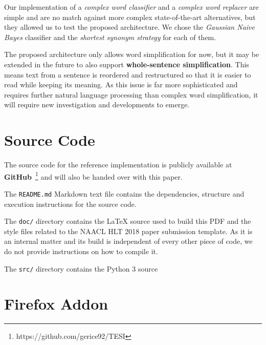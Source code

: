 \documentclass[11pt,a4paper]{article}
\begin{document}
Our implementation of a \emph{complex word classifier} and a \emph{complex word replacer} are simple and are no match against more complex state-of-the-art alternatives, but they allowed us to test the proposed architecture. We chose the \emph{Gaussian Naive Bayes} classifier and the \emph{shortest synonym strategy} for each of them.

The proposed architecture only allows word simplification for now, but it may be extended in the future to also support \textbf{whole-sentence simplification}. This means text from a sentence is reordered and restructured so that it is easier to read while keeping its meaning. As this issue is far more sophisticated and requires further natural language processing than complex word simplification, it will require new investigation and developments to emerge.




\appendix

\section{Source Code}
\label{sec:src}

The source code for the reference implementation is publicly available at \textbf{GitHub}~\footnote{https://github.com/gerice92/TESI} and will also be handed over with this paper.

The \verb|README.md| Markdown text file contains the dependencies, structure and execution instructions for the source code.

The \verb|doc/| directory contains the \LaTeX{} source used to build this PDF and the style files related to the NAACL HLT 2018 paper submission template. As it is an internal matter and its build is independent of every other piece of code, we do not provide instructions on how to compile it.

The \verb|src/| directory contains the Python 3 source

\section{Firefox Addon}
\label{sec:mfx}
\end{document}
